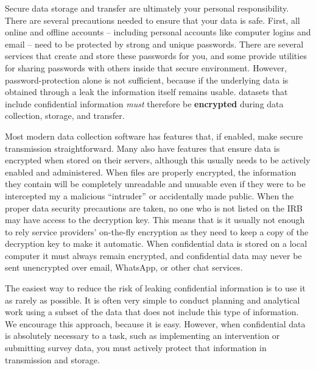 Secure data storage and transfer are ultimately your personal responsibility.
There are several precautions needed to ensure that your data is safe.
First, all online and offline accounts
-- including personal accounts like computer logins and email --
need to be protected by strong and unique passwords.
There are several services that create and store these passwords for you,
and some provide utilities for sharing passwords with others
inside that secure environment.
However, password-protection alone is not sufficient,
because if the underlying data is obtained through a leak the information itself remains usable.
datasets that include confidential information
\textit{must} therefore be \textbf{encrypted}
during data collection, storage, and transfer.

Most modern data collection software has features that,
if enabled, make secure transmission straightforward.
Many also have features that ensure data is encrypted when stored on their servers,
although this usually needs to be actively enabled and administered.
When files are properly encrypted,
the information they contain will be completely unreadable and unusable
even if they were to be intercepted my a malicious
``intruder'' or accidentally made public.
When the proper data security precautions are taken,
no one who is not listed on the IRB may have access to the decryption key.
This means that is it usually not
enough to rely service providers' on-the-fly encryption as they need to keep a copy
of the decryption key to make it automatic. When confidential data is stored on a local
computer it must always remain encrypted, and confidential data may never be sent unencrypted
over email, WhatsApp, or other chat services. 

The easiest way to reduce the risk of leaking confidential information is to use it as rarely as possible.
It is often very simple to conduct planning and analytical work
using a subset of the data that does not include this type of information.
We encourage this approach, because it is easy.
However, when confidential data is absolutely necessary to a task,
such as implementing an intervention
or submitting survey data,
you must actively protect that information in transmission and storage.

